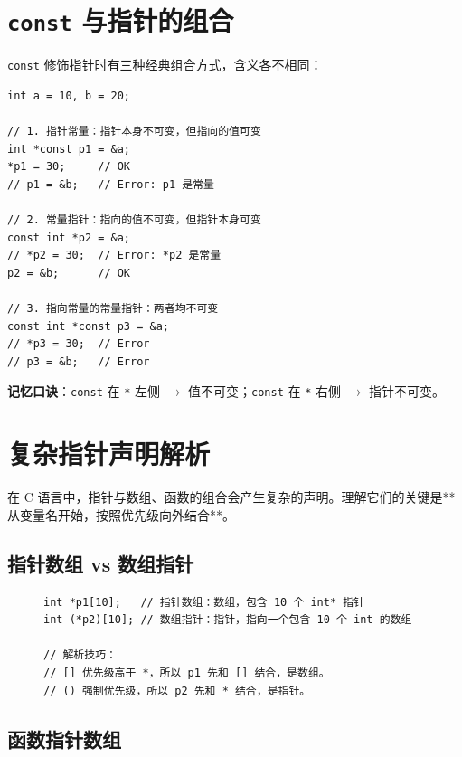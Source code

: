\section{\texttt{const} 与指针的组合}

\texttt{const} 修饰指针时有三种经典组合方式，含义各不相同：

\begin{lstlisting}[caption={const 与指针的三种组合}]
int a = 10, b = 20;

// 1. 指针常量：指针本身不可变，但指向的值可变
int *const p1 = &a;
*p1 = 30;     // OK
// p1 = &b;   // Error: p1 是常量

// 2. 常量指针：指向的值不可变，但指针本身可变
const int *p2 = &a;
// *p2 = 30;  // Error: *p2 是常量
p2 = &b;      // OK

// 3. 指向常量的常量指针：两者均不可变
const int *const p3 = &a;
// *p3 = 30;  // Error
// p3 = &b;   // Error
\end{lstlisting}

\textbf{记忆口诀}：\texttt{const} 在 \texttt{*} 左侧 $\to$ 值不可变；\texttt{const} 在 \texttt{*} 右侧 $\to$ 指针不可变。

\section{复杂指针声明解析}

在 C 语言中，指针与数组、函数的组合会产生复杂的声明。理解它们的关键是**从变量名开始，按照优先级向外结合**。

\subsection{指针数组 vs 数组指针}

\begin{figure}[H]
\centering
\begin{minipage}{0.95\textwidth}
\begin{lstlisting}[caption={指针数组与数组指针}]
int *p1[10];   // 指针数组：数组，包含 10 个 int* 指针
int (*p2)[10]; // 数组指针：指针，指向一个包含 10 个 int 的数组

// 解析技巧：
// [] 优先级高于 *，所以 p1 先和 [] 结合，是数组。
// () 强制优先级，所以 p2 先和 * 结合，是指针。
\end{lstlisting}
\end{minipage}
\end{figure}

\subsection{函数指针数组}


